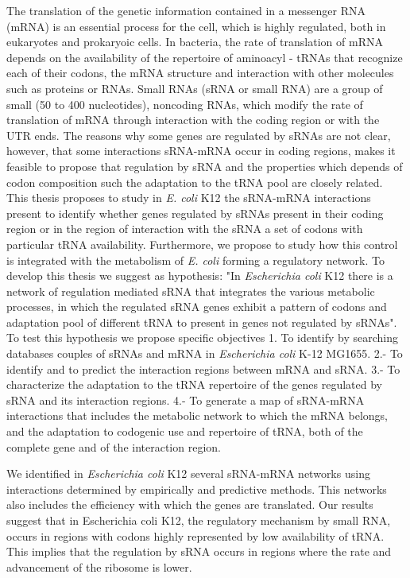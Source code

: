 The translation of the genetic information contained in a messenger RNA (mRNA) is an essential process for the cell, which is highly regulated, both in eukaryotes and prokaryoic cells. In bacteria, the rate of translation of mRNA depends on the availability of the repertoire of aminoacyl - tRNAs that recognize each of their codons, the mRNA structure and interaction with other molecules such as proteins or RNAs. Small RNAs (sRNA or small RNA) are a group of small (50 to 400 nucleotides), noncoding RNAs, which modify the rate of translation of mRNA through interaction with the coding region or with the UTR ends. The reasons why some genes are regulated by sRNAs are not clear, however, that some interactions sRNA-mRNA occur in coding regions, makes it feasible to propose that regulation by sRNA and the properties which depends of codon composition such the adaptation to the tRNA pool are closely related. This thesis proposes to study in \textit{E. coli} K12 the sRNA-mRNA interactions present to identify whether genes regulated by sRNAs present in their coding region or in the region of interaction with the sRNA a set of codons with particular tRNA availability. Furthermore, we propose to study how this control is integrated with the metabolism of \textit{E. coli} forming a regulatory network. To develop this thesis we suggest as hypothesis: "In \textit{Escherichia coli} K12 there is a network of regulation mediated sRNA that integrates the various metabolic processes, in which the regulated sRNA genes exhibit a pattern of codons and adaptation pool of different tRNA to present in genes not regulated by sRNAs". To test this hypothesis we propose specific objectives 1. To identify by searching databases couples of sRNAs and mRNA in \textit{Escherichia coli} K-12 MG1655. 2.- To identify and to predict the interaction regions between mRNA and sRNA. 3.- To characterize the adaptation to the tRNA repertoire of the genes regulated by sRNA and its interaction regions. 4.- To generate a map of sRNA-mRNA interactions that includes the metabolic network to which the mRNA belongs, and the adaptation to codogenic use and repertoire of tRNA, both of the complete gene and of the interaction region.

We identified in \textit{Escherichia coli} K12 several sRNA-mRNA networks using interactions determined by empirically and predictive methods. This networks also includes the efficiency with which the genes are translated. Our results suggest that in Escherichia coli K12, the regulatory mechanism by small RNA, occurs in regions with codons highly represented by low availability of tRNA. This implies that the regulation by sRNA occurs in regions where the rate and advancement of the ribosome is lower.
